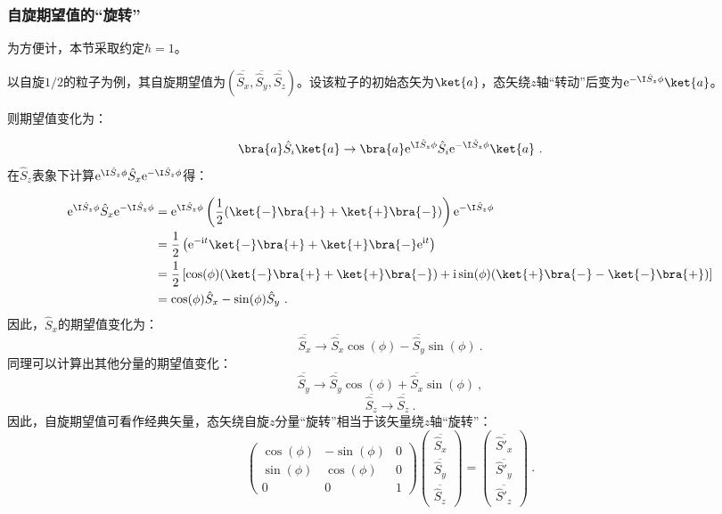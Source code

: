 \subsubsection{自旋期望值的“旋转”}
为方便计，本节采取约定$\hbar=1$。

以自旋$1/2$的粒子为例，其自旋期望值为$(\overline{\hat S_x},\overline{\hat S_y},\overline{\hat S_z})$。设该粒子的初始态矢为$\ket{a}$，态矢绕$z$轴“转动”后变为$\mathrm e^{- \I\hat S_z\phi}\ket{a}$。

则期望值变化为：

\begin{equation}
\bra{a}\hat S_i\ket{a}\rightarrow \bra{a}\mathrm e^{ \I\hat S_z\phi}\hat S_i\mathrm e^{- \I\hat S_z\phi}\ket{a}~.
\end{equation}
在$\hat S_z$表象下计算$\mathrm e^{ \I\hat S_z\phi}\hat S_x\mathrm e^{- \I\hat S_z\phi }$得：

\begin{equation}
\begin{aligned}
\mathrm e^{ \I\hat S_z\phi}\hat S_x\mathrm e^{- \I\hat S_z\phi}&=\mathrm e^{ \I\hat S_z\phi}\left(\frac{1}{2}(\ket{-}\bra{+}+\ket{+}\bra{-})\right)\mathrm e^{- \I\hat S_z\phi}\\
 &=\frac{1}{2}\left(\mathrm e^{-\mathrm i t}\ket{-}\bra{+}+\ket{+}\bra{-}\mathrm e^{\mathrm i t}\right)\\
 &=\frac{1}{2}\left[\cos(\phi)(\ket{-}\bra{+}+\ket{+}\bra{-})+\mathrm i\sin(\phi)(\ket{+}\bra{-}-\ket{-}\bra{+})\right]\\
 &=\cos(\phi) \hat S_x-\sin(\phi) \hat S_y~.
\end{aligned}
\end{equation}
因此，$\hat S_x$的期望值变化为：
\begin{equation}
\overline{\hat S_x}\rightarrow  \overline{\hat S_x}\cos(\phi)-\overline{\hat S_y}\sin(\phi)~.
\end{equation}
同理可以计算出其他分量的期望值变化：
\begin{equation}
\overline{\hat S_y}\rightarrow \overline{\hat S_y}\cos(\phi)+\overline{\hat S_x}\sin(\phi)~,
\end{equation}
\begin{equation}
\overline{\hat S_z}\rightarrow \overline{\hat S_z}~.
\end{equation}
因此，自旋期望值可看作经典矢量，态矢绕自旋$z$分量“旋转”相当于该矢量绕$z$轴“旋转”：
\begin{equation}
\begin{pmatrix}
 \cos(\phi) &-\sin(\phi)  &0 \\
  \sin(\phi) & \cos(\phi)  & 0\\
  0& 0 &1
\end{pmatrix}
\begin{pmatrix}
 \overline{\hat S_x}\\
  \overline{\hat S_y}\\
 \overline{\hat S_z}
\end{pmatrix}
=
\begin{pmatrix}
  \overline{\hat S'_x}\\
  \overline{\hat S'_y}\\
 \overline{\hat S'_z}
\end{pmatrix}~.
\end{equation}

